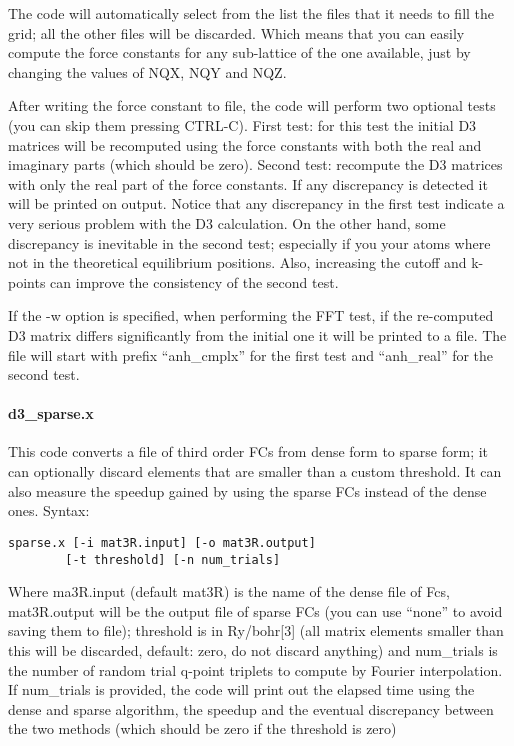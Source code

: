 \documentclass[
]{article}
\begin{document}
The code will automatically select from the list the files that it needs
to fill the grid; all the other files will be discarded. Which means
that you can easily compute the force constants for any sub-lattice of
the one available, just by changing the values of NQX, NQY and NQZ.

After writing the force constant to file, the code will perform two
optional tests (you can skip them pressing CTRL-C). First test: for this
test the initial D3 matrices will be recomputed using the force
constants with both the real and imaginary parts (which should be zero).
Second test: recompute the D3 matrices with only the real part of the
force constants. If any discrepancy is detected it will be printed on
output. Notice that any discrepancy in the first test indicate a very
serious problem with the D3 calculation. On the other hand, some
discrepancy is inevitable in the second test; especially if you your
atoms where not in the theoretical equilibrium positions. Also,
increasing the cutoff and k-points can improve the consistency of the
second test.

If the -w option is specified, when performing the FFT test, if the
re-computed D3 matrix differs significantly from the initial one it will
be printed to a file. The file will start with prefix
\enquote{anh\_cmplx} for the first test and \enquote{anh\_real} for the
second test.

\hypertarget{d3_sparse.x}{%
\paragraph{d3\_sparse.x}\label{d3_sparse.x}}

This code converts a file of third order FCs from dense form to sparse
form; it can optionally discard elements that are smaller than a custom
threshold. It can also measure the speedup gained by using the sparse
FCs instead of the dense ones. Syntax:

\begin{verbatim}
sparse.x [-i mat3R.input] [-o mat3R.output] 
        [-t threshold] [-n num_trials]
\end{verbatim}

Where ma3R.input (default mat3R) is the name of the dense file of Fcs,
mat3R.output will be the output file of sparse FCs (you can use
\enquote{none} to avoid saving them to file); threshold is in
Ry/bohr{[}3{]} (all matrix elements smaller than this will be discarded,
default: zero, do not discard anything) and num\_trials is the number of
random trial q-point triplets to compute by Fourier interpolation. If
num\_trials is provided, the code will print out the elapsed time using
the dense and sparse algorithm, the speedup and the eventual discrepancy
between the two methods (which should be zero if the threshold is zero)
\end{document}
